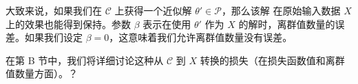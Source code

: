 大致来说，如果我们在 $\mathcal{C}$ 上获得一个近似解 $\theta' \in \mathcal{P}$，那么该解
在原始输入数据 $X$ 上的效果也能得到保持。参数 $\beta$ 表示在使用 $\theta'$ 作为 $X$ 的解时，离群值数量的误
差。如果我们设定 $\beta = 0$，这意味着我们允许离群值数量没有误差。

在第 B 节中，我们将详细讨论这种从 $\mathcal{C}$ 到 $X$ 转换的损失（在损失函数值和离群值数量方面）。？












